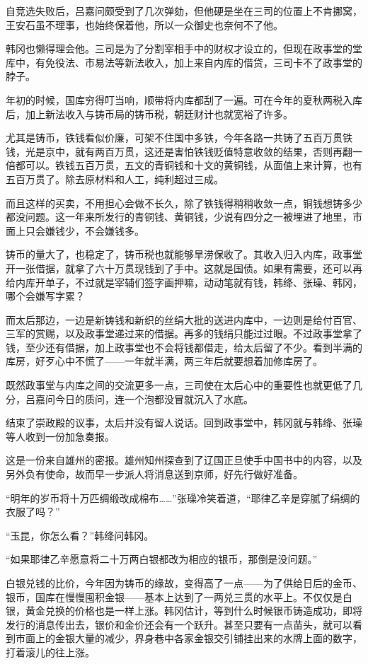 自竞选失败后，吕嘉问颇受到了几次弹劾，但他硬是坐在三司的位置上不肯挪窝，王安石虽不理事，也始终保着他，所以一众御史也奈何不了他。

韩冈也懒得理会他。三司是为了分割宰相手中的财权才设立的，但现在政事堂的堂库中，有免役法、市易法等新法收入，加上来自内库的借贷，三司卡不了政事堂的脖子。

年初的时候，国库穷得叮当响，顺带将内库都刮了一遍。可在今年的夏秋两税入库后，加上新法收入与铸币局的铸币税，朝廷财计也就宽裕了许多。

尤其是铸币，铁钱看似价廉，可架不住国中多铁，今年各路一共铸了五百万贯铁钱，光是京中，就有两百万贯，这还是害怕铁钱贬值特意收敛的结果，否则再翻一倍都可以。铁钱五百万贯，五文的青铜钱和十文的黄铜钱，从面值上来计算，也有五百万贯了。除去原材料和人工，纯利超过三成。

而且这样的买卖，不用担心会做不长久，除了铁钱得稍稍收敛一点，铜钱想铸多少都没问题。这一年来所发行的青铜钱、黄铜钱，少说有四分之一被埋进了地里，市面上只会嫌钱少，不会嫌钱多。

铸币的量大了，也稳定了，铸币税也就能够旱涝保收了。其收入归入内库，政事堂开一张借据，就拿了六十万贯现钱到了手中。这就是国债。如果有需要，还可以再给内库开单子，不过就是宰辅们签字画押嘛，动动笔就有钱，韩绛、张璪、韩冈，哪个会嫌写字累？

而太后那边，一边是新铸钱和新织的丝绢大批的送进内库中，一边则是给付百官、三军的赏赐，以及政事堂递过来的借据。再多的钱绢只能过过眼。不过政事堂拿了钱，至少还有借据，加上政事堂也不会将钱都借走，给太后留了不少。看到半满的库房，好歹心中不慌了——一年就半满，两三年后就要想着加修库房了。

既然政事堂与内库之间的交流更多一点，三司使在太后心中的重要性也就更低了几分，吕嘉问今日的质问，连一个泡都没冒就沉入了水底。

结束了崇政殿的议事，太后并没有留人说话。回到政事堂中，韩冈就与韩绛、张璪等人收到一份加急奏报。

这是一份来自雄州的密报。雄州知州探查到了辽国正旦使手中国书中的内容，以及另外负有使命，故而早一步派人将消息送到京师，好先行做好准备。

“明年的岁币将十万匹绸缎改成棉布……”张璪冷笑着道，“耶律乙辛是穿腻了绢绸的衣服了吗？”

“玉昆，你怎么看？”韩绛问韩冈。

“如果耶律乙辛愿意将二十万两白银都改为相应的银币，那倒是没问题。”

白银兑钱的比价，今年因为铸币的缘故，变得高了一点——为了供给日后的金币、银币，国库在慢慢囤积金银——基本上达到了一两兑三贯的水平上。不仅仅是白银，黄金兑换的价格也是一样上涨。韩冈估计，等到什么时候银币铸造成功，即将发行的消息传出去，银价和金价还会有一个跃升。甚至只要有一点苗头，就可以看到市面上的金银大量的减少，界身巷中各家金银交引铺挂出来的水牌上面的数字，打着滚儿的往上涨。

